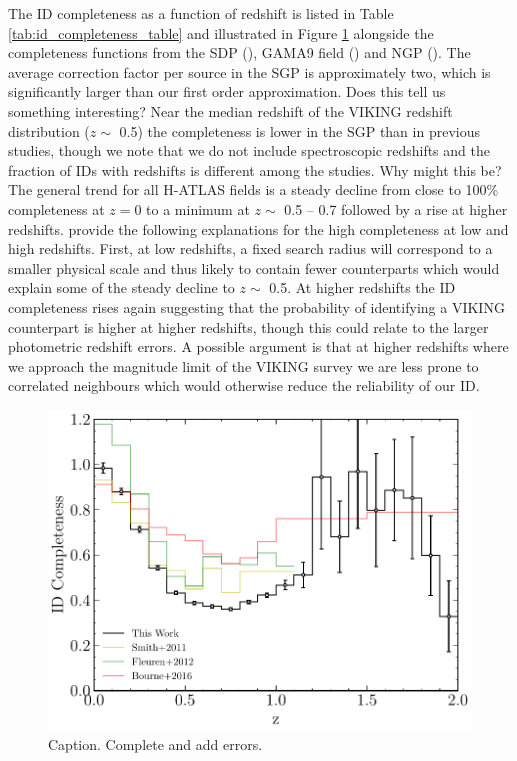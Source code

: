 The ID completeness as a function of redshift is listed in Table \ref{tab:id_completeness_table} and illustrated in Figure \ref{fig:id_completeness} alongside the completeness functions from the SDP (\citealt{Smith_2011}), GAMA9 field (\citealt{Fleuren_2012}) and NGP (\citealt{Bourne_2016}). The average correction factor per source in the SGP is approximately two, which is significantly larger than our first order approximation. {\color{red} Does this tell us something interesting?}  Near the median redshift of the VIKING redshift distribution ($z \sim$ 0.5) the completeness is lower in the SGP than in previous studies, though we note that we do not include spectroscopic redshifts and the fraction of IDs with redshifts is different among the studies. {\color{red} Why might this be?} The general trend for all H-ATLAS fields is a steady decline from close to 100\% completeness at $z = 0$ to a minimum at $z \sim$ 0.5 -- 0.7 followed by a rise at higher redshifts. \citealt{Bourne_2016} provide the following explanations for the high completeness at low and high redshifts. First, at low redshifts, a fixed search radius will correspond to a smaller physical scale and thus likely to contain fewer counterparts which would explain some of the steady decline to $z \sim$ 0.5. At higher redshifts the ID completeness rises again suggesting that the probability of identifying a VIKING counterpart is higher at higher redshifts, though this could relate to the larger photometric redshift errors. A possible argument is that at higher redshifts where we approach the magnitude limit of the VIKING survey we are less prone to correlated neighbours which would otherwise reduce the reliability of our ID.

\begin{figure}
	\centering
	\includegraphics[width=0.75\columnwidth]{Figures/id_completeness.pdf}
	\caption{Caption. {\color{red} Complete and add errors.}}
	\label{fig:id_completeness}
\end{figure}

